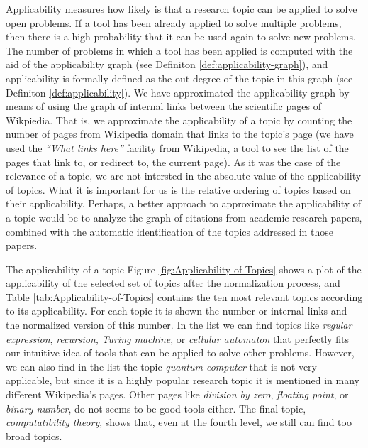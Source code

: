 Applicability measures how likely is that a research topic can be applied to solve open problems. If a tool has been already applied to solve multiple problems, then there is a high probability that it can be used again to solve new problems. The number of problems in which a tool has been applied is computed with the aid of the applicability graph (see Definiton \ref{def:applicability-graph}), and applicability is formally defined as the out-degree of the topic in this graph (see Definiton \ref{def:applicability}). We have approximated the applicability graph by means of using the graph of internal links between the scientific pages of Wikpiedia. That is, we approximate the applicability of a topic by counting the number of pages from Wikipedia domain that links to the topic's page (we have used the \emph{``What links here''} facility from Wikipedia, a tool to see the list of the pages that link to, or redirect to, the current page). As it was the case of the relevance of a topic, we are not intersted in the absolute value of the applicability of topics. What it is important for us is the relative ordering of topics based on their applicability. Perhaps, a better approach to approximate the applicability of a topic would be to analyze the graph of citations from academic research papers, combined with the automatic identification of the topics addressed in those papers.


The applicability of a topic Figure \ref{fig:Applicability-of-Topics} shows a plot of the applicability of the selected set of topics after the normalization process, and Table \ref{tab:Applicability-of-Topics} contains the ten most relevant topics according to its applicability. For each topic it is shown the number or internal links and the normalized version of this number. In the list we can find topics like \emph{regular expression}, \emph{recursion}, \emph{Turing machine}, or \emph{cellular automaton} that perfectly fits our intuitive idea of tools that can be applied to solve other problems. However, we can also find in the list the topic \emph{quantum computer} that is not very applicable, but since it is a highly popular research topic it is mentioned in many different Wikipedia's pages. Other pages like \emph{division by zero}, \emph{floating point}, or \emph{binary number}, do not seems to be good tools either. The final topic, \emph{computatibility theory}, shows that, even at the fourth level, we still can find too broad topics.

